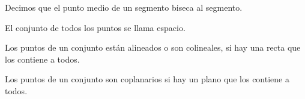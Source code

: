 \begin{tcolorbox}[colback=black!3!,colframe=white]
\begin{def.}
Decimos que el punto medio de un segmento biseca al segmento.
\end{def.}
\end{tcolorbox}

\begin{tcolorbox}[colback=black!3!,colframe=white]
\begin{def.}
El conjunto de todos los puntos se llama espacio.
\end{def.}
\end{tcolorbox}

\begin{tcolorbox}[colback=black!3!,colframe=white]
\begin{def.}
Los puntos de un conjunto están alineados o son colineales, si hay una recta que los contiene a todos.
\end{def.}
\end{tcolorbox}

\begin{tcolorbox}[colback=black!3!,colframe=white]
\begin{def.}
Los puntos de un conjunto son coplanarios si hay un plano que los contiene a todos.
\end{def.}
\end{tcolorbox}

